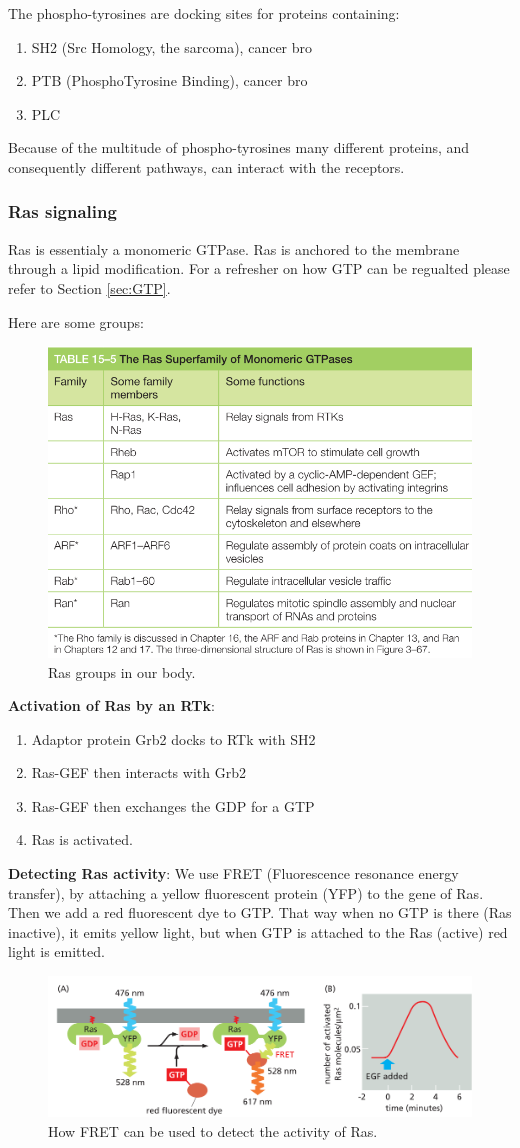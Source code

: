 \documentclass[../main.tex]{subfiles}
\begin{document}
The phospho-tyrosines are docking sites for proteins containing:
\begin{enumerate}
	\item SH2 (Src Homology, the sarcoma), cancer bro
	\item PTB (PhosphoTyrosine Binding), cancer bro
	\item PLC 
\end{enumerate}

Because of the multitude of phospho-tyrosines many different proteins, and consequently different pathways, can interact with the receptors.

\subsubsection{Ras signaling}

Ras is essentialy a monomeric GTPase. Ras is anchored to the membrane through a lipid modification. For a refresher on how GTP can be regualted please refer to Section \ref{sec:GTP}.

Here are some groups:
\begin{figure}[H]
	\centering
	\includegraphics[height=0.3\textwidth]{Ras_ex}
	\caption{Ras groups in our body.}
\end{figure}

\textbf{Activation of Ras by an  RTk}: 
\begin{enumerate}
	\item Adaptor protein Grb2 docks to RTk with SH2
	\item Ras-GEF then interacts with Grb2
	\item Ras-GEF then exchanges the GDP for a GTP
	\item Ras is activated.
\end{enumerate}

\textbf{Detecting Ras activity}: We use FRET (Fluorescence resonance energy  transfer), by attaching a yellow fluorescent protein (YFP) to the gene of Ras. Then we add a red fluorescent dye to GTP. That way when no GTP is there (Ras inactive), it emits yellow light, but when GTP is attached to the Ras (active) red light is emitted.
\begin{figure}[H]
	\centering
	\includegraphics[height=0.3\textwidth]{Ras_FRET}
	\caption{How FRET can be used to detect the activity of Ras.}
\end{figure}
\end{document}
